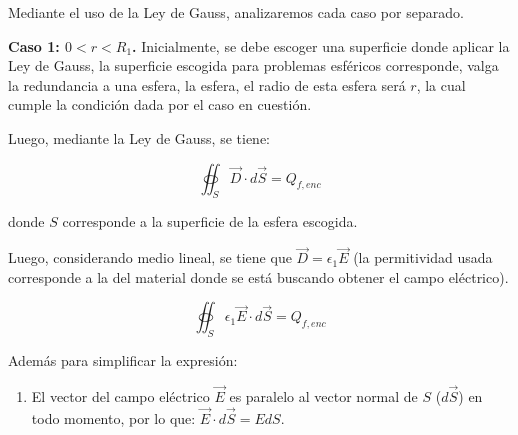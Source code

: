 \documentclass[11pt]{article}
\begin{document}
\begin{solucion}
    Mediante el uso de la Ley de Gauss, analizaremos cada caso por separado.

        {\bfseries \large Caso 1: $0<r<R_1$.}
    Inicialmente, se debe escoger una superficie donde aplicar la Ley de Gauss, la superficie escogida para problemas esféricos corresponde, valga la redundancia a una esfera, la esfera, el radio de esta esfera será $r$, la cual cumple la condición dada por el caso en cuestión.

    \begin{figure}[H]
        \centering
    \end{figure}

    Luego, mediante la Ley de Gauss, se tiene:

    \begin{equation}
        \oiint_S \vec{D} \cdot d\vec{S} = Q_{f, enc}
    \end{equation}

    donde $S$ corresponde a la superficie de la esfera escogida.

    Luego, considerando medio lineal, se tiene que $\vec{D} = \epsilon_1\vec{E}$ (la permitividad usada corresponde a la del material donde se está buscando obtener el campo eléctrico).

    \begin{equation}
        \oiint_S \epsilon_1\vec{E} \cdot d\vec{S} = Q_{f, enc}
    \end{equation}

    Además para simplificar la expresión:

    \begin{enumerate}
        \item El vector del campo eléctrico $\vec{E}$ es paralelo al vector normal de $S$ ($d\vec{S}$) en todo momento, por lo que: $\vec{E} \cdot d\vec{S} = EdS$.


\end{enumerate}
\end{solucion}
\end{document}

